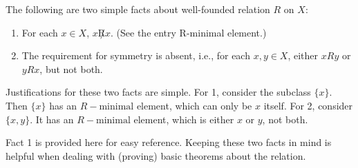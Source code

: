 \documentclass[12pt]{article}
\begin{document}
The following are two simple facts about well-founded relation $R$ on $X$:

\begin{enumerate}
\item For each $x\in X$, $x\not R x$. (See the entry R-minimal element.)\\
\item The requirement for symmetry is absent, i.e., for each $x, y\in X$, either $xRy$ or $yRx$, but not both.
\end{enumerate}

Justifications for these two facts are simple. For 1, consider the subclass $\{x\}$. Then $\{x\}$ has an $R-\textrm{minimal}$ element, which can only be $x$ itself. For 2, consider $\{x, y\}$. It has an $R-\textrm{minimal}$ element, which is either $x$ or $y$, not both.

Fact 1 is provided here for easy reference. Keeping these two facts in mind is helpful when dealing with (proving) basic theorems about the relation.
\end{document}

